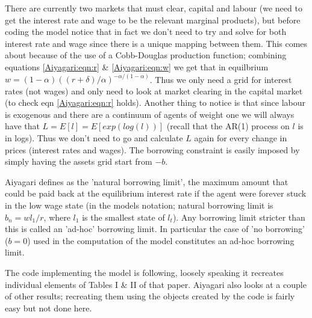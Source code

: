 There are currently two markets that must clear, capital and labour (we need to get the interest rate and wage to be the relevant marginal products), but 
before coding the model notice that in fact we don't need to try and solve for both interest rate and wage since there is a unique mapping between them. This
comes about because of the use of a Cobb-Douglas production function; combining equations \ref{Aiyagari:eqn:r} \& \ref{Aiyagari:eqn:w} we get that in equilbrium
$w=(1-\alpha)((r+\delta)/\alpha)^{-\alpha /(1-\alpha)}$. Thus we only need a grid for interest rates (not wages) and only need to look at market clearing in
the capital market (to check eqn \ref{Aiyagari:eqn:r} holds). Another thing to notice is that since labour is exogenous and there are a continuum of agents
of weight one we will always have that $L=E[l]=E[exp(log(l))]$ (recall that the AR(1) process on $l$ is in logs). Thus we don't need to go and calculate $L$ 
again for every change in prices (interest rates and wages). The borrowing constraint is easily imposed by simply having the assets grid start from $-b$.

Aiyagari defines as the 'natural borrowing limit', the maximum amount that could be paid back at the equilibrium interest rate if the agent were forever 
stuck in the low wage state (in the models notation; natural borrowing limit is $b_n=wl_1/r$, where $l_1$ is the smallest state of $l_t$). Any borrowing 
limit stricter than this is called an 'ad-hoc' borrowing limit. In particular the case of 'no borrowing' ($b=0$) used in the computation of the model
constitutes an ad-hoc borrowing limit.

The code implementing the model is following, loosely speaking it recreates individual elements of Tables I \& II of that paper. Aiyagari also looks 
at a couple of other results; recreating them using the objects created by the code is fairly easy but not done here.




%